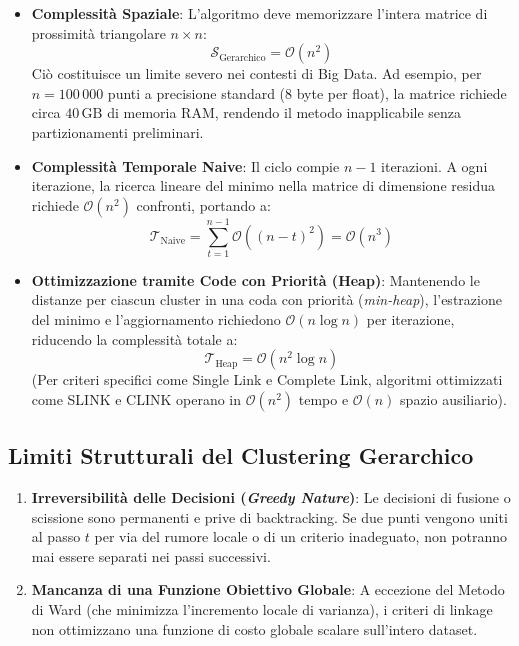 \begin{itemize}
    \item \textbf{Complessità Spaziale}: L'algoritmo deve memorizzare l'intera matrice di prossimità triangolare $n \times n$:
    \begin{equation}
        \mathcal{S}_{\text{Gerarchico}} = \mathcal{O}(n^2)
    \end{equation}
    Ciò costituisce un limite severo nei contesti di Big Data. Ad esempio, per $n = 100\,000$ punti a precisione standard (8 byte per float), la matrice richiede circa $40\,\text{GB}$ di memoria RAM, rendendo il metodo inapplicabile senza partizionamenti preliminari.
    \item \textbf{Complessità Temporale Naive}: Il ciclo compie $n - 1$ iterazioni. A ogni iterazione, la ricerca lineare del minimo nella matrice di dimensione residua richiede $\mathcal{O}(n^2)$ confronti, portando a:
    \begin{equation}
        \mathcal{T}_{\text{Naive}} = \sum_{t=1}^{n-1} \mathcal{O}((n - t)^2) = \mathcal{O}(n^3)
    \end{equation}
    \item \textbf{Ottimizzazione tramite Code con Priorità (Heap)}: Mantenendo le distanze per ciascun cluster in una coda con priorità (\textit{min-heap}), l'estrazione del minimo e l'aggiornamento richiedono $\mathcal{O}(n \log n)$ per iterazione, riducendo la complessità totale a:
    \begin{equation}
        \mathcal{T}_{\text{Heap}} = \mathcal{O}(n^2 \log n)
    \end{equation}
    (Per criteri specifici come Single Link e Complete Link, algoritmi ottimizzati come SLINK e CLINK operano in $\mathcal{O}(n^2)$ tempo e $\mathcal{O}(n)$ spazio ausiliario).
\end{itemize}

\FloatBarrier
\subsection{Limiti Strutturali del Clustering Gerarchico}

\begin{enumerate}
    \item \textbf{Irreversibilità delle Decisioni (\textit{Greedy Nature})}: Le decisioni di fusione o scissione sono permanenti e prive di backtracking. Se due punti vengono uniti al passo $t$ per via del rumore locale o di un criterio inadeguato, non potranno mai essere separati nei passi successivi.
    \item \textbf{Mancanza di una Funzione Obiettivo Globale}: A eccezione del Metodo di Ward (che minimizza l'incremento locale di varianza), i criteri di linkage non ottimizzano una funzione di costo globale scalare sull'intero dataset.
\end{enumerate}

